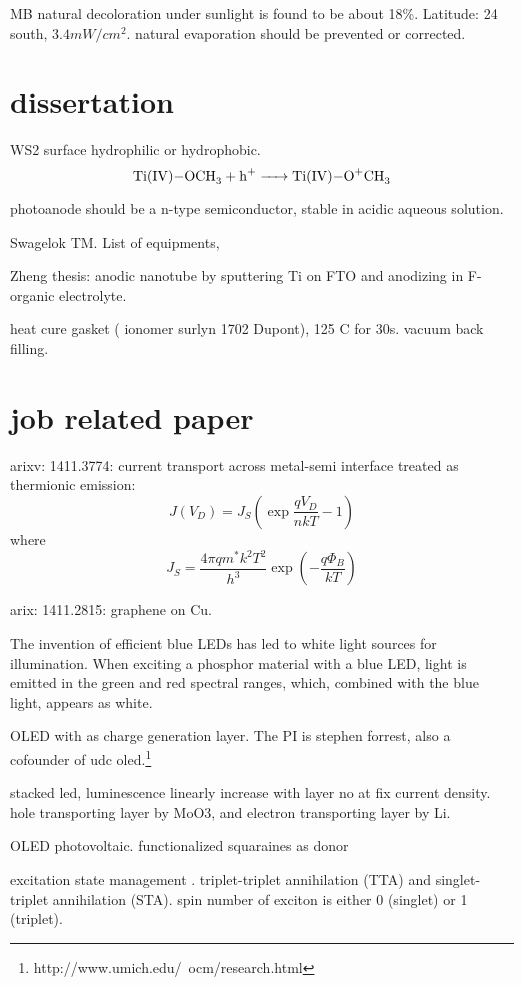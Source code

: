 MB natural decoloration under sunlight is found to be about 18\%.\cite{Nogueira1993} Latitude: 24 south, $3.4mW/cm^2$. natural evaporation should be prevented or corrected.

\section{dissertation}

WS2 surface hydrophilic or hydrophobic.
\[
\cee{Ti(IV)-OCH3 + h^+ -> Ti(IV)-O^+CH3}
\]

 photoanode should be a n-type semiconductor, stable in acidic aqueous solution.

Swagelok TM. List of equipments,

Zheng thesis:  anodic nanotube by sputtering Ti on FTO and anodizing in F-organic electrolyte.

heat cure gasket ( ionomer surlyn 1702 Dupont), 125 C for 30s.
vacuum back filling.



\section{job related paper}

arixv: 1411.3774: current transport across metal-semi interface treated as thermionic emission:
\[
J(V_D) = J_S(\exp\frac{qV_D}{nkT}-1)
\]
where 
\[
J_S = \frac{4\pi q m^* k^2T^2}{h^3}\exp(-\frac{q\Phi_B}{kT})
\]

arix: 1411.2815: graphene on Cu. 


The invention of efficient blue LEDs has led to white light sources for illumination. When exciting a phosphor material with a blue LED, light is emitted in the green and red spectral ranges, which, combined with the blue light, appears as white. 


OLED with  as charge generation layer. \cite{Kanno2006} The PI is stephen forrest, also a cofounder of udc oled.\footnote{http://www.umich.edu/~ocm/research.html}

stacked led, luminescence linearly increase with layer no at fix current density. hole transporting layer by MoO3, and electron transporting layer by Li.

OLED photovoltaic.\cite{Xiao2012a} functionalized squaraines as donor

excitation state management \cite{Zhang2012b}.
triplet-triplet annihilation (TTA) and singlet-triplet annihilation (STA). spin number of exciton is either 0 (singlet) or 1 (triplet).

